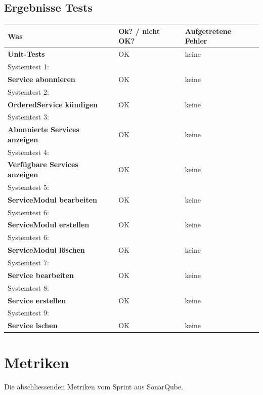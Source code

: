 \documentclass[11pt]{scrartcl}
\begin{document}
\subsection{Ergebnisse Tests}
\begin{tabularx}{\linewidth}{X l l}
\textbf{Was} & \textbf{Ok? / nicht OK?} & \textbf{Aufgetretene Fehler}\\
\hline
\textbf{Unit-Tests} & {\color{green} OK}  & keine\\
\hline
Systemtest 1: & & \\
\textbf{Service abonnieren} & {\color{green} OK} & keine\\
\hline
Systemtest 2: & & \\
\textbf{OrderedService kündigen} & {\color{green} OK}  & keine\\
\hline
Systemtest 3: & & \\
\textbf{Abonnierte Services anzeigen} & {\color{green} OK}  & keine\\
\hline
Systemtest 4: & & \\
\textbf{Verfügbare Services anzeigen} & {\color{green} OK}  & keine\\
\hline
Systemtest 5: & & \\
\textbf{ServiceModul bearbeiten} & {\color{green} OK}  & keine\\
\hline
Systemtest 6: & & \\
\textbf{ServiceModul erstellen} & {\color{green} OK}  & keine\\
\hline
Systemtest 6: & & \\
\textbf{ServiceModul löschen} & {\color{green} OK}  & keine\\
\hline
Systemtest 7: & & \\
\textbf{Service bearbeiten} & {\color{green} OK}  & keine\\
\hline
Systemtest 8: & & \\
\textbf{Service erstellen} & {\color{green} OK}  & keine\\
\hline
Systemtest 9: & & \\
\textbf{Service lschen} & {\color{green} OK}  & keine\\
\hline


\end{tabularx}

\newpage

\section{Metriken}
Die abschliessenden Metriken vom Sprint aus SonarQube.
\end{document}
